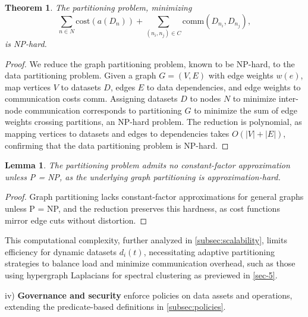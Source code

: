\documentclass{amsart}
\newtheorem{thm}{Theorem}
\newtheorem{lem}{Lemma}
\begin{document}
\begin{thm} \label{thm:partitioning_np_hard}
The partitioning problem, minimizing 
\[
 \sum_{n \in N} \text{cost}(a(D_n)) + \sum_{(n_i, n_j) \in C} \text{comm}(D_{n_i}, D_{n_j}),
 \]
  is NP-hard.
\end{thm}
\begin{proof}
We reduce the graph partitioning problem, known to be NP-hard, to the data partitioning problem. Given a graph \( G = (V, E) \) with edge weights \( w(e) \), map vertices \( V \) to datasets \( D \), edges \( E \) to data dependencies, and edge weights to communication costs \( \text{comm} \). Assigning datasets \( D \) to nodes \( N \) to minimize inter-node communication corresponds to partitioning \( G \) to minimize the sum of edge weights crossing partitions, an NP-hard problem. The reduction is polynomial, as mapping vertices to datasets and edges to dependencies takes \( O(|V| + |E|) \), confirming that the data partitioning problem is NP-hard.
\end{proof}

\begin{lem} \label{lem:partitioning_approx}
The partitioning problem admits no constant-factor approximation unless P = NP, as the underlying graph partitioning is approximation-hard.
\end{lem}

\begin{proof}
Graph partitioning lacks constant-factor approximations for general graphs unless P = NP, and the reduction preserves this hardness, as cost functions mirror edge cuts without distortion.
\end{proof}

This computational complexity, further analyzed in \cref{subsec:scalability}, limits efficiency for dynamic datasets \( d_i(t) \), necessitating adaptive partitioning strategies to balance load and minimize communication overhead, such as those using hypergraph Laplacians for spectral clustering as previewed in \cref{sec-5}.




iv) \textbf{Governance and security} enforce policies on data assets and operations, extending the predicate-based definitions in \cref{subsec:policies}.
\end{document}

